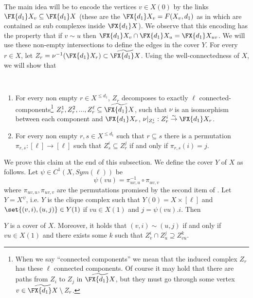 The main idea will be to encode the vertices \(v \in X(0)\) by the links \(\FX{d_1}X_v \subseteq \FX{d_1}X\) (these are the \(\FX{d_1}X_v = F(X_v,d_1)\) as in  which are contained as sub complexes inside \(\FX{d_1}X\)). We observe that this encoding has the property that if \(v \sim u\) then \(\FX{d_1}X_v \cap \FX{d_1}X_u = \FX{d_1}X_{uv}\). We will use these non-empty intersections to define the edges in the cover $Y$. For every \(r \in X\), let \(Z_r = \nu^{-1}(\FX{d_1}X_r)\subset \widetilde {\FX{d_1}X}\). Using the well-connectedness of \(X\), we will show that
%
\begin{claim} \label{claim:Z_v-decomposes}~
    \begin{enumerate}
        \item For every non empty \(r \in X^{\leq d_1}\), \(Z_r\) decomposes to exactly \(\ell\) connected-components\footnote{When we say ``connected components'' we mean that the induced complex \(Z_r\) has these \(\ell\) connected components. Of course it may hold that there are paths from \(Z_i\) to \(Z_j\) in \(\widetilde{\FX{d_1}X}\), but they must go through some vertex \(v \in \widetilde{\FX{d_1}X} \setminus Z_r\).} \(Z_r^1,Z_r^2,...,Z_r^\ell \subseteq \widetilde{\FX{d_1}X}\), such that \(\nu\) is an isomorphism between each component and \(\FX{d_1}X_r\), \(\nu|_{Z_r^i}:Z_r^i \overset{\sim}{\to} \FX{d_1}X_r\). 
        \item For every non empty \(r,s \in X^{\leq d_1}\) such that \(r \subseteq s\) there is a permutation \(\pi_{r,s}:[\ell] \to [\ell]\) such that \(Z_{s}^{i} \subseteq Z_{r}^{j}\) if and only if \(\pi_{r,s}(i)=j\).
    \end{enumerate} 
\end{claim}
%
We prove this claim at the end of this subsection. We define the cover \(Y\) of \(X\) as follows. 
Let \(\psi \in C^1(X,Sym(\ell))\) be
\begin{equation} \label{eq:cocycle-def}
    \psi(vu)=\pi_{uv,u}^{-1}\circ \pi_{uv,v}
\end{equation}
where \(\pi_{uv,u},\pi_{uv,v}\) are the permutations promised by the second item of . Let \(Y=X^\psi\), i.e. \(Y\) is the clique complex such that \(Y(0)=X \times [\ell]\) and \(\set{(v,i),(u,j)} \in Y(1)\) if \(vu \in X(1)\) and \(j=\psi(vu).i\). Then
\begin{lemma} \label{lem:Y-is-a-cover-of-X}
    \(Y\) is a cover of \(X\). Moreover, it holds that \((v,i) \sim (u,j)\) if and only if \(vu \in X(1)\) and there exists some \(k\) such that \(Z_v^i \cap Z_u^j \supseteq Z_{vu}^k\).
\end{lemma}

